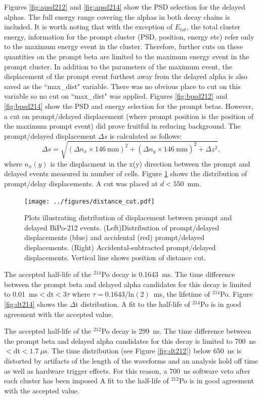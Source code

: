 Figures \ref{fig:apsd212} and \ref{fig:apsd214} show the PSD selection for the delayed alphas. The full energy range covering the alphas in both decay chains is included.
It is worth noting that with the exception of $E_{tot}$, the total cluster energy, information for the prompt cluster (PSD, position, energy etc) refer only to the maximum energy event in the cluster. Therefore, further cuts on these quantities on the prompt beta are limited to the maximum energy event in the prompt cluster. In addition to the parameters of the maximum event, the displacement of the prompt event furthest away from the delayed alpha is also saved as the ``max\_dist" variable. There was no obvious place to cut on this variable so no cut on ``max\_dist" was applied. Figures \ref{fig:bpsd212} and \ref{fig:bpsd214} show the PSD and energy selection for the prompt betas. 
However, a cut on prompt/delayed displacement (where prompt position is the position of the maximum prompt event) did prove fruitful in reducing background. The prompt/delayed displacement $\Delta s$ is calculated as follows:
\[
\Delta s=\sqrt{(\Delta n_x\times 146~\textrm{mm})^2+(\Delta n_y\times146~\textrm{mm})^2 + \Delta z^2},
\]
where $n_x(y)$ is the displacment in the x(y) direction between the prompt and delayed events measured in number of cells. Figure \ref{fig:deltaD} shows the distribution of prompt/delay displacements. A cut was placed at $d<550$~mm.
\begin{figure}[ht]
\centering
\texttt{[image: ../figures/distance\_cut.pdf]}
\caption{\label{fig:deltaD}Plots illustrating distribution of displacement between prompt and delayed BiPo-212 events. (Left)Distribution of prompt/delayed displacements (blue) and accidental (red) prompt/delayed displacements. (Right) Accidental-subtracted prompt/delayed displacements. Vertical line shows position of distance cut.}
\end{figure}

The accepted half-life of the $^{214}$Po decay is 0.1643~ms. The time difference between the prompt beta and delayed alpha candidates for this decay is limited to 0.01~ms$<$dt$<3\tau$ where $\tau=0.1643/\textrm{ln}(2)$~ms, the lifetime of $^{214}$Po. Figure \ref{fig:dt214} shows the $\Delta$t distribution. A fit to the half-life of $^{214}$Po is in good agreement with the accepted value.

The accepted half-life of the $^{212}$Po decay is 299~ns. The time difference between the prompt beta and delayed alpha candidates for this decay is limited to 700~ns$<$dt$<1.7~\mu$s. The time distribution (see Figure \ref{fig:dt212}) below 650~ns is distorted by artifacts of the length of the waveforms and an analysis hold off time as well as hardware trigger effects.  For this reason, a 700~ns software veto after each cluster has been imposed  A fit to the half-life of $^{212}$Po is in good agreement with the accepted value. 

